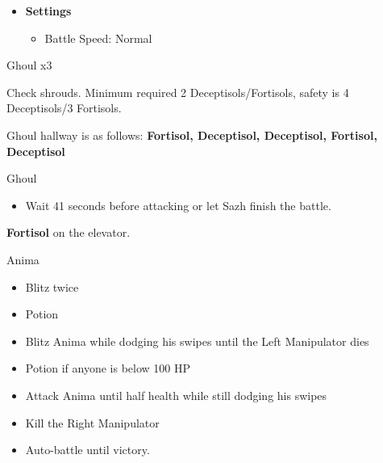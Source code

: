 	\begin{menu}
		\begin{itemize}
			\item \textbf{Settings}
			      \begin{itemize}
				      \item Battle Speed: Normal
			      \end{itemize}
		\end{itemize}
	\end{menu}

	\begin{battle}[0:12]{Ghoul x3}
	\end{battle}

	Check shrouds. Minimum required 2 Deceptisols/Fortisols, safety is 4 Deceptisols/3 Fortisols.

	Ghoul hallway is as follows: {\bf Fortisol, Deceptisol, Deceptisol, Fortisol, Deceptisol}

	\begin{battle}[0:41]{Ghoul}
		\begin{itemize}
			\item Wait 41 seconds before attacking or let Sazh finish the battle.
		\end{itemize}
	\end{battle}

	\textbf{Fortisol} on the elevator.

	\begin{battle}[0:54]{Anima}

		\begin{itemize}
			\item Blitz twice
			\item Potion
			\item Blitz Anima while dodging his swipes until the Left Manipulator dies
			\item Potion if anyone is below 100 HP
			\item Attack Anima until half health while still dodging his swipes
			\item Kill the Right Manipulator
			\item Auto-battle until victory.
		\end{itemize}
	\end{battle}


	\vfill
	\ 
	\columnbreak

